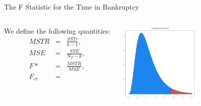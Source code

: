 \begin{frame}{The F Statistic for the Time in Bankruptcy}

  \begin{columns}

    We define the following quantities:
    \begin{eqnarray*}
      MSTR & = & \frac{SSTr}{k-1}, \\
      MSE  & = & \frac{SSE}{N_T - k}, \\
      F*   & = & \frac{MSTR}{MSE}, \\
      F_{cr} & = &
    \end{eqnarray*}

    \vfill


    \vfill

    \centerline{\includegraphics[width=4cm]{img/FDistribution}}

    \vfill

    \end{columns}

  
\end{frame}



